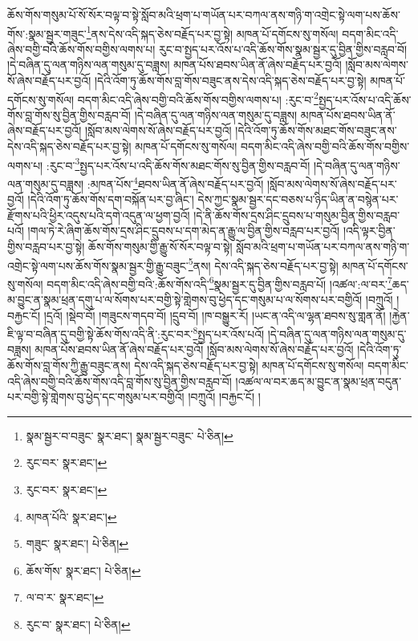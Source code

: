 ཆོས་གོས་གསུམ་པོ་སོ་སོར་བལྟ་བ་སྟེ་སློབ་མའི་ཕྲག་པ་གཡོན་པར་བཀལ་ནས་གཉི་ག་འགྲེང་སྟེ་ལག་པས་ཆོས་གོས་:སྣམ་སྦྱར་གཟུང་\footnote{སྣམ་སྦྱར་བ་བཟུང་  སྣར་ཐང་། སྣམ་སྦྱར་བཟུང་  པེ་ཅིན། }ནས་དེས་འདི་སྐད་ཅེས་བརྗོད་པར་བྱ་སྟེ། མཁན་པོ་དགོངས་སུ་གསོལ། བདག་མིང་འདི་ཞེས་བགྱི་བའི་ཆོས་གོས་བགྱིས་ལགས་པ། རུང་བ་སྤྱད་པར་འོས་པ་འདི་ཆོས་གོས་སྣམ་སྦྱར་དུ་བྱིན་གྱིས་བརླབ་བོ། །དེ་བཞིན་དུ་ལན་གཉིས་ལན་གསུམ་དུ་བཟླས། མཁན་པོས་ཐབས་ཡིན་ནོ་ཞེས་བརྗོད་པར་བྱའོ། །སློབ་མས་ལེགས་སོ་ཞེས་བརྗོད་པར་བྱའོ། །དེའི་འོག་ཏུ་ཆོས་གོས་བླ་གོས་བཟུང་ནས་དེས་འདི་སྐད་ཅེས་བརྗོད་པར་བྱ་སྟེ། མཁན་པོ་དགོངས་སུ་གསོལ། བདག་མིང་འདི་ཞེས་བགྱི་བའི་ཆོས་གོས་བགྱིས་ལགས་པ། :རུང་བ་\footnote{རུང་བར་  སྣར་ཐང་། }སྤྱད་པར་འོས་པ་འདི་ཆོས་གོས་བླ་གོས་སུ་བྱིན་གྱིས་བརླབ་བོ། །དེ་བཞིན་དུ་ལན་གཉིས་ལན་གསུམ་དུ་བཟླས། མཁན་པོས་ཐབས་ཡིན་ནོ་ཞེས་བརྗོད་པར་བྱའོ། །སློབ་མས་ལེགས་སོ་ཞེས་བརྗོད་པར་བྱའོ། །དེའི་འོག་ཏུ་ཆོས་གོས་མཐང་གོས་བཟུང་ནས་དེས་འདི་སྐད་ཅེས་བརྗོད་པར་བྱ་སྟེ། མཁན་པོ་དགོངས་སུ་གསོལ། བདག་མིང་འདི་ཞེས་བགྱི་བའི་ཆོས་གོས་བགྱིས་ལགས་པ། :རུང་བ་\footnote{རུང་བར་  སྣར་ཐང་། }སྤྱད་པར་འོས་པ་འདི་ཆོས་གོས་མཐང་གོས་སུ་བྱིན་གྱིས་བརླབ་བོ། །དེ་བཞིན་དུ་ལན་གཉིས་ལན་གསུམ་དུ་བཟླས། :མཁན་པོས་\footnote{མཁན་པོའི་  སྣར་ཐང་། }ཐབས་ཡིན་ནོ་ཞེས་བརྗོད་པར་བྱའོ། །སློབ་མས་ལེགས་སོ་ཞེས་བརྗོད་པར་བྱའོ། །དེའི་འོག་ཏུ་ཆོས་གོས་དག་བསྐོན་པར་བྱ་ཞིང་། དེས་ཀྱང་སྣམ་སྦྱར་དང་བཅས་པ་ཉིད་ཡིན་ན་བསྙེན་པར་རྫོགས་པའི་ཕྱིར་འདུས་པའི་དགེ་འདུན་ལ་ཕྱག་བྱའོ། །དེ་ནི་ཆོས་གོས་དྲས་ཤིང་དྲུབས་པ་གསུམ་བྱིན་གྱིས་བརླབ་པའོ། །གལ་ཏེ་རེ་ཞིག་ཆོས་གོས་དྲས་ཤིང་དྲུབས་པ་དག་མེད་ན་རྒྱུ་ལ་བྱིན་གྱིས་བརླབ་པར་བྱའོ། །འདི་ལྟར་བྱིན་གྱིས་བརླབ་པར་བྱ་སྟེ། ཆོས་གོས་གསུམ་གྱི་རྒྱུ་སོ་སོར་བལྟ་བ་སྟེ། སློབ་མའི་ཕྲག་པ་གཡོན་པར་བཀལ་ནས་གཉི་ག་འགྲེང་སྟེ་ལག་པས་ཆོས་གོས་སྣམ་སྦྱར་གྱི་རྒྱུ་བཟུང་\footnote{གཟུང་  སྣར་ཐང་།  པེ་ཅིན། }ནས། དེས་འདི་སྐད་ཅེས་བརྗོད་པར་བྱ་སྟེ། མཁན་པོ་དགོངས་སུ་གསོལ། བདག་མིང་འདི་ཞེས་བགྱི་བའི་:ཆོས་གོས་འདི་\footnote{ཆོས་གོས་  སྣར་ཐང་།  པེ་ཅིན། }སྣམ་སྦྱར་དུ་བྱིན་གྱིས་བརླབ་པོ། །འཚལ་:ལ་བར་\footnote{ལ་བ་ར་  སྣར་ཐང་། }ཆད་མ་བྱུང་ན་སྣམ་ཕྲན་དགུ་པ་ལ་སོགས་པར་བགྱི་སྟེ་གླེགས་བུ་ཕྱེད་དང་གསུམ་པ་ལ་སོགས་པར་བགྱིའོ། །བཀྲུའོ། །བརྐྱང་ངོ། །དྲའོ། །སྡེབ་བོ། །གཟུངས་གདབ་བོ། །དྲུབ་བོ། །ཁ་བསྒྱུར་རོ། །ཡང་ན་འདི་ལ་ལྷན་ཐབས་སུ་གླན་ནོ། །རྐྱེན་ཇི་ལྟ་བ་བཞིན་དུ་བགྱི་སྟེ་ཆོས་གོས་འདི་ནི་:རུང་བར་\footnote{རུང་བ་  སྣར་ཐང་།  པེ་ཅིན། }སྤྱད་པར་འོས་པའོ། །དེ་བཞིན་དུ་ལན་གཉིས་ལན་གསུམ་དུ་བཟླས། མཁན་པོས་ཐབས་ཡིན་ནོ་ཞེས་བརྗོད་པར་བྱའོ། །སློབ་མས་ལེགས་སོ་ཞེས་བརྗོད་པར་བྱའོ། །དེའི་འོག་ཏུ་ཆོས་གོས་བླ་གོས་ཀྱི་རྒྱུ་བཟུང་ནས། དེས་འདི་སྐད་ཅེས་བརྗོད་པར་བྱ་སྟེ། མཁན་པོ་དགོངས་སུ་གསོལ། བདག་མིང་འདི་ཞེས་བགྱི་བའི་ཆོས་གོས་འདི་བླ་གོས་སུ་བྱིན་གྱིས་བརླབ་བོ། །འཚལ་ལ་བར་ཆད་མ་བྱུང་ན་སྣམ་ཕྲན་བདུན་པར་བགྱི་སྟེ་གླེགས་བུ་ཕྱེད་དང་གསུམ་པར་བགྱིའོ། །བཀྲུའོ། །བརྐྱང་ངོ། །
